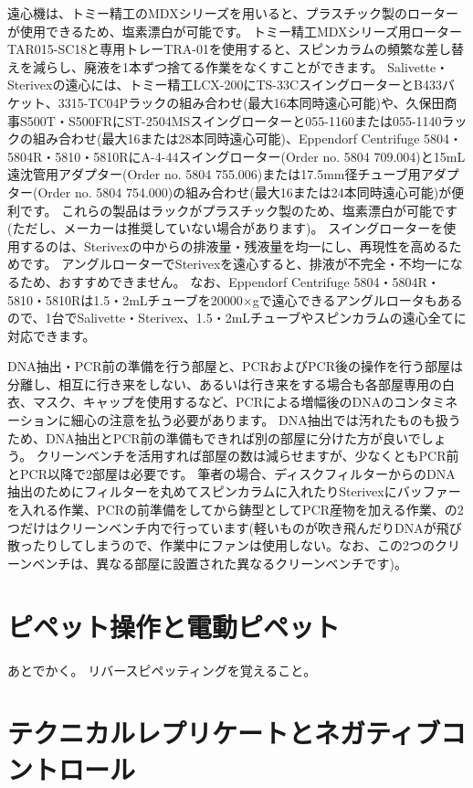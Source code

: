 \documentclass[titlepage,10pt,a4paper,uplatex]{jsbook}
\begin{document}
遠心機は、トミー精工のMDXシリーズを用いると、プラスチック製のローターが使用できるため、塩素漂白が可能です。
トミー精工MDXシリーズ用ローターTAR015-SC18と専用トレーTRA-01を使用すると、スピンカラムの頻繁な差し替えを減らし、廃液を1本ずつ捨てる作業をなくすことができます。
Salivette・Sterivexの遠心には、トミー精工LCX-200にTS-33CスイングローターとB433バケット、3315-TC04Pラックの組み合わせ(最大16本同時遠心可能)や、久保田商事S500T・S500FRにST-2504MSスイングローターと055-1160または055-1140ラックの組み合わせ(最大16または28本同時遠心可能)、Eppendorf Centrifuge 5804・5804R・5810・5810RにA-4-44スイングローター(Order no. 5804 709.004)と15mL遠沈管用アダプター(Order no. 5804 755.006)または17.5mm径チューブ用アダプター(Order no. 5804 754.000)の組み合わせ(最大16または24本同時遠心可能)が便利です。
これらの製品はラックがプラスチック製のため、塩素漂白が可能です(ただし、メーカーは推奨していない場合があります)。
スイングローターを使用するのは、Sterivexの中からの排液量・残液量を均一にし、再現性を高めるためです。
アングルローターでSterivexを遠心すると、排液が不完全・不均一になるため、おすすめできません。
なお、Eppendorf Centrifuge 5804・5804R・5810・5810Rは1.5・2mLチューブを20000×gで遠心できるアングルロータもあるので、1台でSalivette・Sterivex、1.5・2mLチューブやスピンカラムの遠心全てに対応できます。

DNA抽出・PCR前の準備を行う部屋と、PCRおよびPCR後の操作を行う部屋は分離し、相互に行き来をしない、あるいは行き来をする場合も各部屋専用の白衣、マスク、キャップを使用するなど、PCRによる増幅後のDNAのコンタミネーションに細心の注意を払う必要があります。
DNA抽出では汚れたものも扱うため、DNA抽出とPCR前の準備もできれば別の部屋に分けた方が良いでしょう。
クリーンベンチを活用すれば部屋の数は減らせますが、少なくともPCR前とPCR以降で2部屋は必要です。
筆者の場合、ディスクフィルターからのDNA抽出のためにフィルターを丸めてスピンカラムに入れたりSterivexにバッファーを入れる作業、PCRの前準備をしてから鋳型としてPCR産物を加える作業、の2つだけはクリーンベンチ内で行っています(軽いものが吹き飛んだりDNAが飛び散ったりしてしまうので、作業中にファンは使用しない。なお、この2つのクリーンベンチは、異なる部屋に設置された異なるクリーンベンチです)。

\section{ピペット操作と電動ピペット}

あとでかく。
リバースピペッティングを覚えること。

\section{テクニカルレプリケートとネガティブコントロール}
\end{document}

